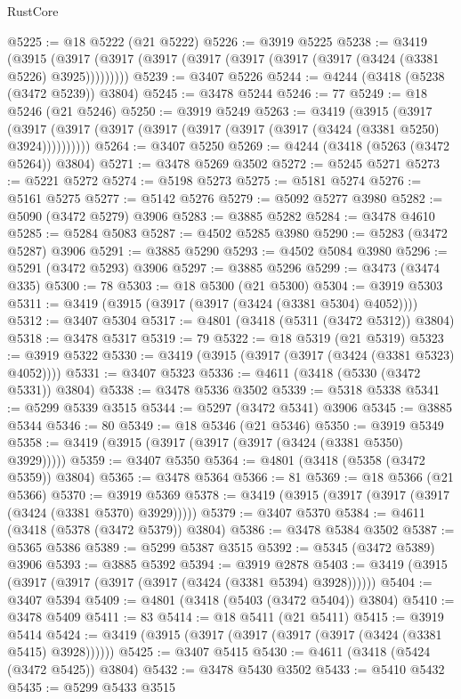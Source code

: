 \begin{lexlean}{RustCore}
\begin{coremodule}
@5225 := @18 @5222 (@21 @5222)
@5226 := @3919 @5225
@5238 := @3419
    (@3915 (@3917 (@3917 (@3917 (@3917 (@3917 (@3917 (@3917 (@3424 (@3381 @5226) @3925)))))))))
@5239 := @3407 @5226
@5244 := @4244 (@3418 (@5238 (@3472 @5239)) @3804)
@5245 := @3478 @5244
@5246 := 77
@5249 := @18 @5246 (@21 @5246)
@5250 := @3919 @5249
@5263 := @3419
    (@3915
      (@3917 (@3917 (@3917 (@3917 (@3917 (@3917 (@3917 (@3917 (@3424 (@3381 @5250) @3924))))))))))
@5264 := @3407 @5250
@5269 := @4244 (@3418 (@5263 (@3472 @5264)) @3804)
@5271 := @3478 @5269 @3502
@5272 := @5245 @5271
@5273 := @5221 @5272
@5274 := @5198 @5273
@5275 := @5181 @5274
@5276 := @5161 @5275
@5277 := @5142 @5276
@5279 := @5092 @5277 @3980
@5282 := @5090 (@3472 @5279) @3906
@5283 := @3885 @5282
@5284 := @3478 @4610
@5285 := @5284 @5083
@5287 := @4502 @5285 @3980
@5290 := @5283 (@3472 @5287) @3906
@5291 := @3885 @5290
@5293 := @4502 @5084 @3980
@5296 := @5291 (@3472 @5293) @3906
@5297 := @3885 @5296
@5299 := @3473 (@3474 @335)
@5300 := 78
@5303 := @18 @5300 (@21 @5300)
@5304 := @3919 @5303
@5311 := @3419 (@3915 (@3917 (@3917 (@3424 (@3381 @5304) @4052))))
@5312 := @3407 @5304
@5317 := @4801 (@3418 (@5311 (@3472 @5312)) @3804)
@5318 := @3478 @5317
@5319 := 79
@5322 := @18 @5319 (@21 @5319)
@5323 := @3919 @5322
@5330 := @3419 (@3915 (@3917 (@3917 (@3424 (@3381 @5323) @4052))))
@5331 := @3407 @5323
@5336 := @4611 (@3418 (@5330 (@3472 @5331)) @3804)
@5338 := @3478 @5336 @3502
@5339 := @5318 @5338
@5341 := @5299 @5339 @3515
@5344 := @5297 (@3472 @5341) @3906
@5345 := @3885 @5344
@5346 := 80
@5349 := @18 @5346 (@21 @5346)
@5350 := @3919 @5349
@5358 := @3419 (@3915 (@3917 (@3917 (@3917 (@3424 (@3381 @5350) @3929)))))
@5359 := @3407 @5350
@5364 := @4801 (@3418 (@5358 (@3472 @5359)) @3804)
@5365 := @3478 @5364
@5366 := 81
@5369 := @18 @5366 (@21 @5366)
@5370 := @3919 @5369
@5378 := @3419 (@3915 (@3917 (@3917 (@3917 (@3424 (@3381 @5370) @3929)))))
@5379 := @3407 @5370
@5384 := @4611 (@3418 (@5378 (@3472 @5379)) @3804)
@5386 := @3478 @5384 @3502
@5387 := @5365 @5386
@5389 := @5299 @5387 @3515
@5392 := @5345 (@3472 @5389) @3906
@5393 := @3885 @5392
@5394 := @3919 @2878
@5403 := @3419 (@3915 (@3917 (@3917 (@3917 (@3917 (@3424 (@3381 @5394) @3928))))))
@5404 := @3407 @5394
@5409 := @4801 (@3418 (@5403 (@3472 @5404)) @3804)
@5410 := @3478 @5409
@5411 := 83
@5414 := @18 @5411 (@21 @5411)
@5415 := @3919 @5414
@5424 := @3419 (@3915 (@3917 (@3917 (@3917 (@3917 (@3424 (@3381 @5415) @3928))))))
@5425 := @3407 @5415
@5430 := @4611 (@3418 (@5424 (@3472 @5425)) @3804)
@5432 := @3478 @5430 @3502
@5433 := @5410 @5432
@5435 := @5299 @5433 @3515

\end{coremodule}
\end{lexlean}

